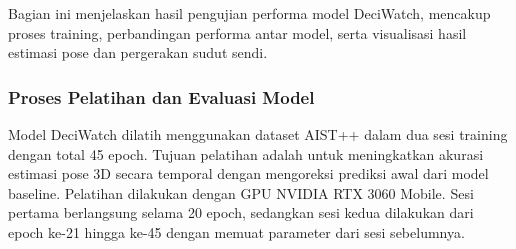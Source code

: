 Bagian ini menjelaskan hasil pengujian performa model DeciWatch, mencakup proses training, perbandingan performa antar model, serta visualisasi hasil estimasi pose dan pergerakan sudut sendi.

\subsubsection{Proses Pelatihan dan Evaluasi Model}

Model DeciWatch dilatih menggunakan dataset AIST++ dalam dua sesi training dengan total 45 epoch. Tujuan pelatihan adalah untuk meningkatkan akurasi estimasi pose 3D secara temporal dengan mengoreksi prediksi awal dari model baseline. Pelatihan dilakukan dengan GPU NVIDIA RTX 3060 Mobile. Sesi pertama berlangsung selama 20 epoch, sedangkan sesi kedua dilakukan dari epoch ke-21 hingga ke-45 dengan memuat parameter dari sesi sebelumnya.


